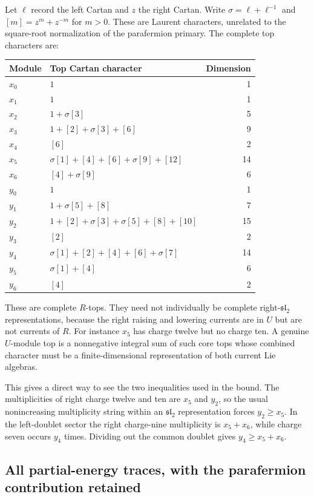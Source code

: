 Let $\ell$ record the left Cartan and $z$ the right Cartan.
Write $\sigma=\ell+\ell^{-1}$ and $[m]=z^m+z^{-m}$ for
$m>0$. These are Laurent characters, unrelated to the square-root
normalization of the parafermion primary. The complete top characters
are:
\begin{longtable}{@{}llr@{}}
\toprule
Module&Top Cartan character&Dimension\\
\midrule\endhead
$x_0$&$1$&1\\
$x_1$&$1$&1\\
$x_2$&$1+\sigma[3]$&5\\
$x_3$&$1+[2]+\sigma[3]+[6]$&9\\
$x_4$&$[6]$&2\\
$x_5$&$\sigma[1]+[4]+[6]+\sigma[9]+[12]$&14\\
$x_6$&$[4]+\sigma[9]$&6\\
$y_0$&$1$&1\\
$y_1$&$1+\sigma[5]+[8]$&7\\
$y_2$&$1+[2]+\sigma[3]+\sigma[5]+[8]+[10]$&15\\
$y_3$&$[2]$&2\\
$y_4$&$\sigma[1]+[2]+[4]+[6]+\sigma[7]$&14\\
$y_5$&$\sigma[1]+[4]$&6\\
$y_6$&$[4]$&2\\
\bottomrule
\end{longtable}

These are complete $R$-tops. They need not individually be complete
right-$\mathfrak{sl}_2$ representations, because the right raising
and lowering currents are in $U$ but are not currents of $R$.
For instance $x_5$ has charge twelve but no charge ten. A genuine
$U$-module top is a nonnegative integral sum of such core tops
whose combined character must be a finite-dimensional representation
of both current Lie algebras.

This gives a direct way to see the two inequalities used in the
bound. The multiplicities of right charge twelve and ten are
$x_5$ and $y_2$, so the usual nonincreasing multiplicity string
within an $\mathfrak{sl}_2$ representation forces $y_2\ge x_5$.
In the left-doublet sector the right charge-nine multiplicity is
$x_5+x_6$, while charge seven occurs $y_4$ times. Dividing out
the common doublet gives $y_4\ge x_5+x_6$.

\subsection{All partial-energy traces, with the parafermion contribution retained}

